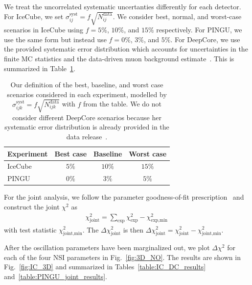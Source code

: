 We treat the uncorrelated systematic uncertanties differently for each detector. For IceCube, we set $\sigma_{ij}^\text{syst} = f\sqrt{N_{ij}^\text{data}}$.
We consider best, normal, and worst-case scenarios in IceCube using
$f=5\%$, $10\%$, and $15\%$ respectively. For PINGU, we use the same form but instead use $f=0\%$, $3\%$, and $5\%$.
For DeepCore, we use the provided systematic error distribution which accounts for uncertainties in the finite MC statistics and the data-driven 
muon background estimate~\cite{DC2019data}. This is summarized in Table~\ref{table:syst_errors}.
{\renewcommand{\arraystretch}{1.2}
\begin{table}
   \centering
   \begin{tabular}{lccc}
      \hline \hline
      Experiment & Best case & Baseline & Worst case \\
      \hline
      IceCube & $5\%$ & $10\%$ & $15\%$ \\
      PINGU & $0\%$ & $3\%$ & $5\%$ \\
      \hline \hline
   \end{tabular}
   \caption{Our definition of the best, baseline, and worst case scenarios considered in each experiment, modelled by $\sigma_{ijk}^\text{syst} = f\sqrt{N_{ijk}^\text{data}}$ with $f$ from the table.
   We do not consider different DeepCore scenarios because her systematic error distribution is already provided in the data release~\cite{DC2019data}.}\label{table:syst_errors}
\end{table}

For the joint analysis, we follow the parameter goodness-of-fit prescription~\cite{maltoni2003} and construct the joint $\chi^2$ as 
\begin{align}\label{eq:joint_chisq}
    \chi^2_\text{joint} = \sum_\text{exp}\chi^2_\text{exp} - \chi^2_\text{exp,min}\,
\end{align}
with test statistic $\chi^2_\text{joint,min}$. The $\Delta \chi^2_\text{joint}$ is then $\Delta \chi^2_\text{joint} = \chi^2_\text{joint} - \chi^2_\text{joint,min}$.

After the oscillation parameters have been marginalized out, we plot $\Delta \chi^2$ for each of the four NSI parameters in Fig.~\ref{fig:3D_NO}. 
The results are shown in Fig.~\ref{fig:IC_3D} and summarized in Tables~\ref{table:IC_DC_results} and~\ref{table:PINGU_joint_results}.

}
